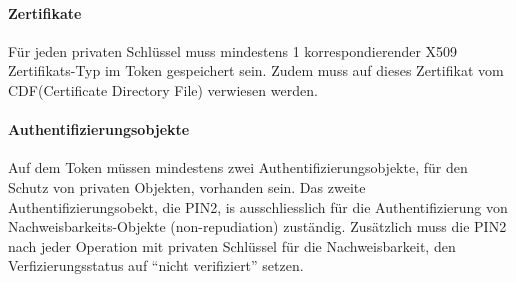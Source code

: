 \documentclass[10pt,a4paper]{article}
\begin{document}
\paragraph{Zertifikate}
Für jeden privaten Schlüssel muss mindestens 1 korrespondierender X509 Zertifikats-Typ im
Token gespeichert sein. Zudem muss auf dieses Zertifikat vom CDF(Certificate Directory
File) verwiesen werden.

\paragraph{Authentifizierungsobjekte}
Auf dem Token müssen mindestens zwei Authentifizierungsobjekte, für den Schutz von
privaten Objekten, vorhanden sein. Das zweite Authentifizierungsobekt, die PIN2, is
ausschliesslich für die Authentifizierung von Nachweisbarkeits-Objekte (non-repudiation)
zuständig. Zusätzlich muss die PIN2 nach jeder Operation mit privaten Schlüssel für die
Nachweisbarkeit, den Verfizierungsstatus auf "`nicht verifiziert"' setzen.
\end{document}
